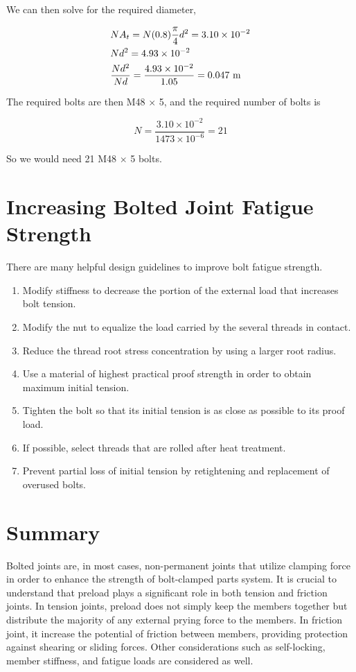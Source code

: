 \documentclass[
10pt,
a4paper,
openany,
svgnames,
]{book}
\begin{document}
\begin{solution}
We can then solve for the required diameter,

\begin{gather*}
  NA_t = N(0.8)\frac{\pi }{4}d^2 = 3.10 \times 10^{-2} \hfill \\
  Nd^2 = 4.93 \times 10^{-2} \hfill \\
  \frac{Nd^2}{Nd} = \frac{4.93 \times 10^{-2}}{1.05} = 0.047 \text{ m} \hfill
\end{gather*}

The required bolts are then M48 $\times$ 5, and the required number of bolts is

\[N = \frac{3.10 \times 10^{-2}}{1473 \times 10^{-6}} = 21\]

So we would need 21 M48 $\times$ 5 bolts.
\end{solution}

\section{Increasing Bolted Joint Fatigue Strength}

There are many helpful design guidelines to improve bolt fatigue strength.
\begin{enumerate}
\item Modify stiffness to decrease the portion of the external load that increases bolt tension.
\item Modify the nut to equalize the load carried by the several threads in contact.
\item Reduce the thread root stress concentration by using a larger root radius.
\item Use a material of highest practical proof strength in order to obtain maximum initial tension.
\item Tighten the bolt so that its initial tension is as close as possible to its proof load.
\item If possible, select threads that are rolled after heat treatment.
\item Prevent partial loss of initial tension by retightening and replacement of overused bolts.
\end{enumerate}

\section*{Summary}

Bolted joints are, in most cases, non-permanent joints that utilize clamping force in order to enhance the strength of bolt-clamped parts system. It is crucial to understand that preload plays a significant role in both tension and friction joints. In tension joints, preload does not simply keep the members together but distribute the majority of any external prying force to the members. In friction joint, it increase the potential of friction between members, providing protection against shearing or sliding forces. Other considerations such as self-locking, member stiffness, and fatigue loads are considered as well.
\end{document}
